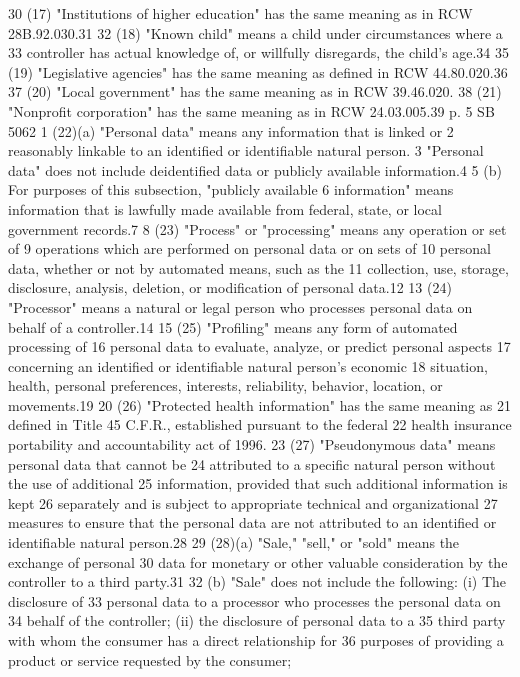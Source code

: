 30 (17) "Institutions of higher education" has the same meaning as
in RCW 28B.92.030.31
32 (18) "Known child" means a child under circumstances where a
33 controller has actual knowledge of, or willfully disregards, the
child's age.34
35 (19) "Legislative agencies" has the same meaning as defined in
RCW 44.80.020.36
37 (20) "Local government" has the same meaning as in RCW 39.46.020.
38 (21) "Nonprofit corporation" has the same meaning as in RCW
24.03.005.39
p. 5 SB 5062
1 (22)(a) "Personal data" means any information that is linked or
2 reasonably linkable to an identified or identifiable natural person.
3 "Personal data" does not include deidentified data or publicly
available information.4
5 (b) For purposes of this subsection, "publicly available
6 information" means information that is lawfully made available from
federal, state, or local government records.7
8 (23) "Process" or "processing" means any operation or set of
9 operations which are performed on personal data or on sets of
10 personal data, whether or not by automated means, such as the
11 collection, use, storage, disclosure, analysis, deletion, or
modification of personal data.12
13 (24) "Processor" means a natural or legal person who processes
personal data on behalf of a controller.14
15 (25) "Profiling" means any form of automated processing of
16 personal data to evaluate, analyze, or predict personal aspects
17 concerning an identified or identifiable natural person's economic
18 situation, health, personal preferences, interests, reliability,
behavior, location, or movements.19
20 (26) "Protected health information" has the same meaning as
21 defined in Title 45 C.F.R., established pursuant to the federal
22 health insurance portability and accountability act of 1996.
23 (27) "Pseudonymous data" means personal data that cannot be
24 attributed to a specific natural person without the use of additional
25 information, provided that such additional information is kept
26 separately and is subject to appropriate technical and organizational
27 measures to ensure that the personal data are not attributed to an
identified or identifiable natural person.28
29 (28)(a) "Sale," "sell," or "sold" means the exchange of personal
30 data for monetary or other valuable consideration by the controller
to a third party.31
32 (b) "Sale" does not include the following: (i) The disclosure of
33 personal data to a processor who processes the personal data on
34 behalf of the controller; (ii) the disclosure of personal data to a
35 third party with whom the consumer has a direct relationship for
36 purposes of providing a product or service requested by the consumer;

